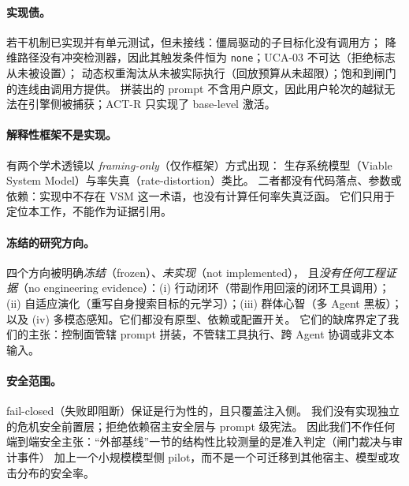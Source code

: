 \paragraph{实现债。} 若干机制已实现并有单元测试，但未接线：僵局驱动的子目标化没有调用方；
降维路径没有冲突检测器，因此其触发条件恒为 \texttt{none}；UCA-03 不可达（拒绝标志从未被设置）；
动态权重淘汰从未被实际执行（回放预算从未超限）；饱和到闸门的连线由调用方提供。
拼装出的 prompt 不含用户原文，因此用户轮次的越狱无法在引擎侧被捕获；ACT-R 只实现了 base-level 激活。

\paragraph{解释性框架不是实现。} 有两个学术透镜以 \emph{framing-only}（仅作框架）方式出现：
生存系统模型（Viable System Model）与率失真（rate-distortion）类比。
二者都没有代码落点、参数或依赖：实现中不存在 VSM 这一术语，也没有计算任何率失真泛函。
它们只用于定位本工作，不能作为证据引用。

\paragraph{冻结的研究方向。} 四个方向被明确\emph{冻结}（frozen）、\emph{未实现}（not implemented），
且\emph{没有任何工程证据}（no engineering evidence）：(i) 行动闭环（带副作用回滚的闭环工具调用）；
(ii) 自适应演化（重写自身搜索目标的元学习）；(iii) 群体心智（多 Agent 黑板）；
以及 (iv) 多模态感知。它们都没有原型、依赖或配置开关。
它们的缺席界定了我们的主张：控制面管辖 prompt 拼装，不管辖工具执行、跨 Agent 协调或非文本输入。

\paragraph{安全范围。} fail-closed（失败即阻断）保证是行为性的，且只覆盖注入侧。
我们没有实现独立的危机安全前置层；拒绝依赖宿主安全层与 prompt 级宪法。
因此我们不作任何端到端安全主张：“外部基线”一节的结构性比较测量的是准入判定（闸门裁决与审计事件）
加上一个小规模模型侧 pilot，而不是一个可迁移到其他宿主、模型或攻击分布的安全率。
